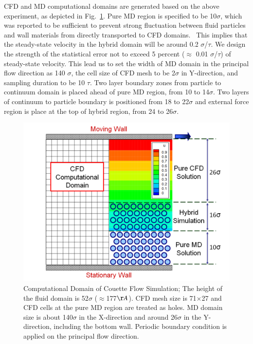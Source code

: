 \documentclass[preprint,12pt]{elsarticle}
\begin{document}
CFD and MD computational domains are generated based on the above experiment, as depicted in Fig.~\ref{Couette_Val_Domain}. Pure MD region is specified to be 10$\sigma$, which was reported to be sufficient to prevent strong fluctuation between fluid particles and wall materials from directly transported to CFD domains.~\cite{Yen} This implies that the steady-state velocity in the hybrid domain will be around 0.2 $\sigma$/$\tau$. We design the strength of the statistical error not to exceed 5 percent ($\approx$ 0.01 $\sigma$/$\tau$) of steady-state velocity. This lead us to set the width of MD domain in the principal flow direction as 140 $\sigma$, the cell size of CFD mesh to be 2$\sigma$ in Y-direction, and sampling duration to be 10 $\tau$. Two layer boundary zones from particle to continuum domain is placed ahead of pure MD region, from 10 to 14$\sigma$. Two layers of continuum to particle boundary is positioned from 18 to 22$\sigma$ and external force region is place at the top of hybrid region, from 24 to 26$\sigma$.


\begin{figure}
\centering
\includegraphics[width=0.8\linewidth]{Couette_Val_Domain.pdf}
\vskip-0.2cm
\caption{\small Computational Domain of Couette Flow Simulation; The height of the fluid domain is 52$\sigma$ ($\approx$177$\AA$). CFD mesh size is 71$\times$27 and CFD cells at the pure MD region are treated as holes. MD domain size is about 140$\sigma$ in the X-direction and around 26$\sigma$ in the Y-direction, including the bottom wall. Periodic boundary condition is applied on the principal flow direction.}
\label{Couette_Val_Domain}
\end{figure}
\end{document}
